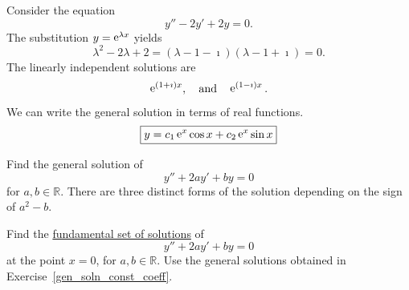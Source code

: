 \begin{Example}
  Consider the equation
  \[ 
  y'' - 2 y' + 2 y = 0.
  \]
  The substitution $y = \mathop{\mathrm{e}}\nolimits^{\lambda x}$ yields
  \[ 
  \lambda^2 - 2 \lambda + 2 = (\lambda -1 -\imath)(\lambda -1 + \imath) = 0. 
  \]
  The linearly independent solutions are
  \[ 
  \mathop{\mathrm{e}}\nolimits^{(1 + \imath)x}, \quad \mathrm{and} \quad \mathop{\mathrm{e}}\nolimits^{(1 - \imath)x}.
  \]
  We can write the general solution in terms of real functions.
  \[ 
  \boxed{
    y = c_1 \mathop{\mathrm{e}}\nolimits^x \cos x + c_2 \mathop{\mathrm{e}}\nolimits^x \sin x
    } 
  \]
\end{Example}




\begin{Exercise}
  \label{exercise y+2ay+by}
  \label{gen_soln_const_coeff}
  Find the general solution of
  \[
  y'' + 2 a y' + b y = 0
  \]
  for $a,b \in \mathbb{R}$.  There are three distinct forms of the solution
  depending on the sign of $a^2 - b$.

\end{Exercise}



\begin{Exercise}
  \label{exercise fund set y+2ay+by}
  \label{fund_set_const_coeff}
  Find the 
  \hyperref[section The Fundamental Set of Solutions]
    {fundamental set of solutions}
  of
  \[
  y'' + 2 a y' + b y = 0
  \]
  at the point $x = 0$, for $a,b \in \mathbb{R}$.  
  Use the general solutions obtained in Exercise~\ref{gen_soln_const_coeff}.

\end{Exercise}





